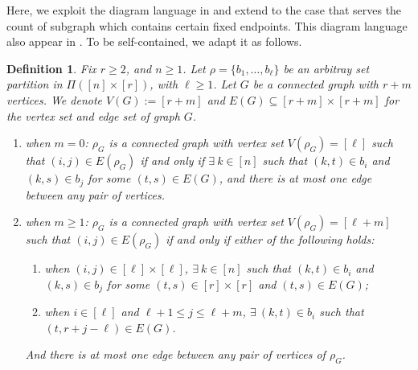 \documentclass[12pt]{article}
\newtheorem{definition}[prop]{Definition}
\numberwithin{equation}{section}
\begin{document}
Here, we exploit the diagram language in \cite{LiuPrivault23a} and extend to the case that serves the count of subgraph which contains certain fixed endpoints. This diagram language also appear in \cite{LiuPri23b}. To be self-contained, we adapt it as follows.  
\begin{definition}\label{def:diagram}
  Fix $r\ge2$, and $n\ge1$. Let $\rho=\{b_1,\dots,b_\ell\}$ be an arbitray set partition in $\Pi([n]\times[r])$, with $\ell\ge1$. Let $G$ be a connected graph with $r+m$ vertices. We denote $V(G):=[r+m]$ and $E(G)\subseteq[r+m]\times[r+m]$ for the vertex set and edge set of graph $G$.
  \begin{enumerate}
    \item when $m=0$: $\rho_G$ is a connected graph with vertex set $V(\rho_G)=[\ell]$ such that $(i,j)\in E(\rho_G)$ if and only if $\exists ~k\in[n]$ such that $(k,t)\in b_i$ and $(k,s)\in b_j$ for some $(t,s)\in E(G)$, and there is at most one edge between any pair of vertices.
    \item when $m\ge1$: $\rho_G$ is a connected graph with vertex set $V(\rho_G)=[\ell+m]$ such that $(i,j)\in E(\rho_G)$ if and only if either of the following holds:
    \begin{enumerate}
      \item when $(i,j)\in[\ell]\times[\ell]$, $\exists ~k\in[n]$ such that $(k,t)\in b_i$ and $(k,s)\in b_j$ for some $(t,s)\in[r]\times[r]$ and $(t,s)\in E(G)$;
      \item when $i\in[\ell]$ and $\ell+1\le j\le \ell +m$, $\exists ~(k,t)\in b_i$ such that $(t,r+j-\ell)\in E(G)$.
    \end{enumerate}
    And there is at most one edge between any pair of vertices of $\rho_G$.
  \end{enumerate}
\end{definition}
\end{document}
